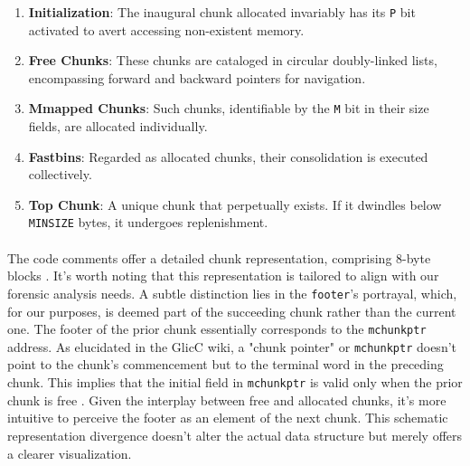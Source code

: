        \begin{enumerate}
            \item \textbf{Initialization}: The inaugural chunk allocated invariably has its \texttt{P} bit activated to avert accessing non-existent memory.
            
            \item \textbf{Free Chunks}: These chunks are cataloged in circular doubly-linked lists, encompassing forward and backward pointers for navigation.
            
            \item \textbf{Mmapped Chunks}: Such chunks, identifiable by the \texttt{M} bit in their size fields, are allocated individually.
            
            \item \textbf{Fastbins}: Regarded as allocated chunks, their consolidation is executed collectively.
            
            \item \textbf{Top Chunk}: A unique chunk that perpetually exists. If it dwindles below \texttt{MINSIZE} bytes, it undergoes replenishment.
        \end{enumerate}
        
        \paragraph{}The code comments offer a detailed chunk representation, comprising 8-byte blocks \cite{gloger_malloc_2001}. It's worth noting that this representation is tailored to align with our forensic analysis needs. A subtle distinction lies in the \texttt{footer}'s portrayal, which, for our purposes, is deemed part of the succeeding chunk rather than the current one. The footer of the prior chunk essentially corresponds to the \texttt{mchunkptr} address. As elucidated in the GlicC wiki, a "chunk pointer" or \texttt{mchunkptr} doesn't point to the chunk's commencement but to the terminal word in the preceding chunk. This implies that the initial field in \texttt{mchunkptr} is valid only when the prior chunk is free \cite{delorie_malloc_2023}. Given the interplay between free and allocated chunks, it's more intuitive to perceive the footer as an element of the next chunk. This schematic representation divergence doesn't alter the actual data structure but merely offers a clearer visualization.
        

